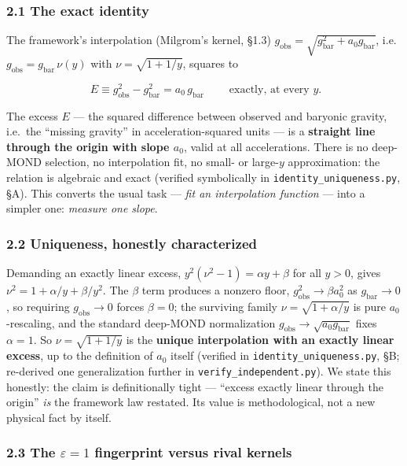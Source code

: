 \documentclass[
]{article}
\begin{document}
\subsubsection{2.1 The exact identity}\label{the-exact-identity}

The framework's interpolation (Milgrom's kernel, §1.3)
\(g_\mathrm{obs}=\sqrt{g_\mathrm{bar}^2+a_0 g_\mathrm{bar}}\),
i.e.~\(g_\mathrm{obs}=g_\mathrm{bar}\,\nu(y)\) with \(\nu=\sqrt{1+1/y}\),
squares to

\[\boxed{\;E\equiv g_\mathrm{obs}^2-g_\mathrm{bar}^2 = a_0\,g_\mathrm{bar}\;}\qquad\text{exactly, at every }y.\]

The excess \(E\) --- the squared difference between observed and
baryonic gravity, i.e.~the ``missing gravity'' in acceleration-squared
units --- is a \textbf{straight line through the origin with slope
\(a_0\)}, valid at all accelerations. There is no deep-MOND selection,
no interpolation fit, no small- or large-\(y\) approximation: the
relation is algebraic and exact (verified symbolically in
\texttt{identity\_uniqueness.py}, §A). This converts the usual task ---
\emph{fit an interpolation function} --- into a simpler one:
\emph{measure one slope}.

\subsubsection{2.2 Uniqueness, honestly
characterized}\label{uniqueness-honestly-characterized}

Demanding an exactly linear excess, \(y^2(\nu^2-1)=\alpha y+\beta\) for
all \(y>0\), gives \(\nu^2=1+\alpha/y+\beta/y^2\). The \(\beta\) term
produces a nonzero floor, \(g_\mathrm{obs}^2\to\beta a_0^2\) as
\(g_\mathrm{bar}\to0\), so requiring \(g_\mathrm{obs}\to0\) forces
\(\beta=0\); the surviving family \(\nu=\sqrt{1+\alpha/y}\) is pure
\(a_0\)-rescaling, and the standard deep-MOND normalization
\(g_\mathrm{obs}\to\sqrt{a_0 g_\mathrm{bar}}\) fixes \(\alpha=1\). So
\(\nu=\sqrt{1+1/y}\) is the \textbf{unique interpolation with an exactly
linear excess}, up to the definition of \(a_0\) itself (verified in
\texttt{identity\_uniqueness.py}, §B; re-derived one generalization
further in \texttt{verify\_independent.py}). We state this honestly: the
claim is definitionally tight --- ``excess exactly linear through the
origin'' \emph{is} the framework law restated. Its value is
methodological, not a new physical fact by itself.

\subsubsection{\texorpdfstring{2.3 The \(\varepsilon=1\) fingerprint
versus rival
kernels}{2.3 The \textbackslash varepsilon=1 fingerprint versus rival kernels}}\label{the-varepsilon1-fingerprint-versus-rival-kernels}
\end{document}
